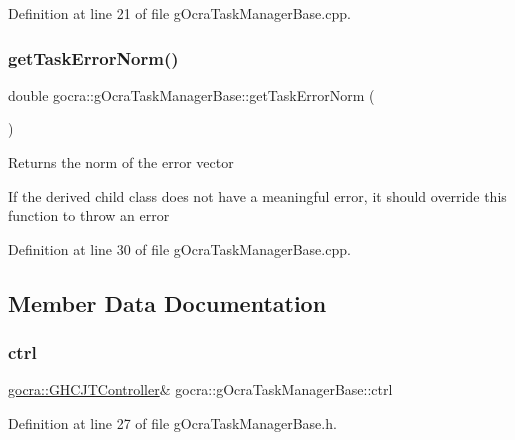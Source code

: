 Definition at line 21 of file g\+Ocra\+Task\+Manager\+Base.\+cpp.

\hypertarget{classgocra_1_1gOcraTaskManagerBase_ab38cda0adc96728270cc881d83644fda}{}\label{classgocra_1_1gOcraTaskManagerBase_ab38cda0adc96728270cc881d83644fda} 
\subsubsection{\texorpdfstring{get\+Task\+Error\+Norm()}{getTaskErrorNorm()}}
{\footnotesize\ttfamily double gocra\+::g\+Ocra\+Task\+Manager\+Base\+::get\+Task\+Error\+Norm (\begin{DoxyParamCaption}{ }\end{DoxyParamCaption})}

Returns the norm of the error vector

If the derived child class does not have a meaningful error, it should override this function to throw an error 

Definition at line 30 of file g\+Ocra\+Task\+Manager\+Base.\+cpp.



\subsection{Member Data Documentation}
\hypertarget{classgocra_1_1gOcraTaskManagerBase_a52d76d9b54d92f3d31faeaafda99e4c7}{}\label{classgocra_1_1gOcraTaskManagerBase_a52d76d9b54d92f3d31faeaafda99e4c7} 
\subsubsection{\texorpdfstring{ctrl}{ctrl}}
{\footnotesize\ttfamily \hyperlink{classgocra_1_1GHCJTController}{gocra\+::\+G\+H\+C\+J\+T\+Controller}\& gocra\+::g\+Ocra\+Task\+Manager\+Base\+::ctrl\hspace{0.3cm}{\ttfamily [protected]}}



Definition at line 27 of file g\+Ocra\+Task\+Manager\+Base.\+h.

